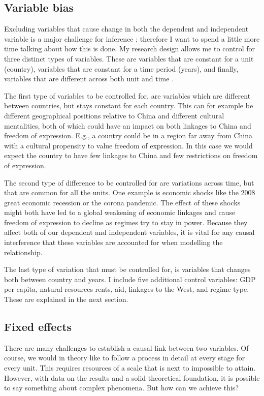\subsection{Variable bias}
Excluding variables that cause change in both the dependent and independent variable is a major challenge for inference \citep[pp. 205-210]{toshkov_research_2016}; therefore I want to spend a little more time talking about how this is done. My research design allows me to control for three distinct types of variables. These are variables that are constant for a unit (country), variables that are constant for a time period (years), and finally, variables that are different across both unit and time \citep{huntington-klein_effect_2022}. 

The first type of variables to be controlled for, are variables which are different between countries, but stays constant for each country. This can for example be different geographical positions relative to China and different cultural mentalities, both of which could have an impact on both linkages to China and freedom of expression. E.g., a country could be in a region far away from China with a cultural propensity to value freedom of expression. In this case we would expect the country to have few linkages to China and few restrictions on freedom of expression.

The second type of difference to be controlled for are variations across time, but that are common for all the units. One example is economic shocks like the 2008 great economic recession or the corona pandemic. The effect of these shocks might both have led to a global weakening of economic linkages and cause freedom of expression to decline as regimes try to stay in power. Because they affect both of our dependent and independent variables, it is vital for any causal interference that these variables are accounted for when modelling the relationship.

The last type of variation that must be controlled for, is variables that changes both between country and years. I include five additional control variables: GDP per capita, natural resources rents, aid, linkages to the West, and regime type. These are explained in the next section.

\subsection{Fixed effects}
There are many challenges to establish a causal link between two variables. Of course, we would in theory like to follow a process in detail at every stage for every unit. This requires resources of a scale that is next to impossible to attain. However, with data on the results and a solid theoretical foundation, it is possible to say something about complex phenomena. But how can we achieve this?

